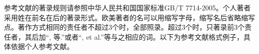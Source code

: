 	参考文献的著录规则请参照中华人民共和国国家标准GB/T 7714-2005。个人著者采用姓在前名在后的著录形式。欧美著者的名可以用缩写字母，缩写名后省略缩写点。著作方式相同的责任者不超过3个时，全部照录。超过3个时，只著录前3个责任者，其后加“, 等.”或者“, et al.”等与之相应的词。以下为参考文献格式例子，具体依据个人参考文献。

	\begingroup
	    \setlength{\bibsep}{0pt}
	\endgroup

\cleardoublepage
\section*{} %
\label{sec:附件}
%

